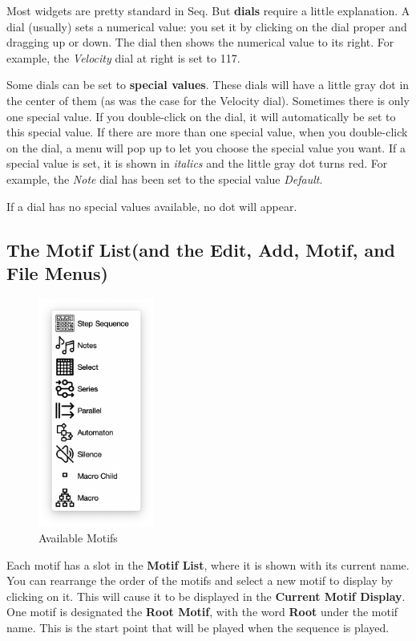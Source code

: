 \documentclass[twoside,10pt]{article}
\begin{document}
Most widgets are pretty standard in Seq.  But {\bf dials} require a little explanation.    A dial (usually) sets a numerical value: you set it by clicking on the dial proper and dragging up or down.  The dial then shows the numerical value to its right.   For example, the {\it Velocity} dial at right is set to 117.  

Some dials can be set to {\bf special values}.  These dials will have a little gray dot in the center of them (as was the case for the Velocity dial).  Sometimes there is only one special value.  If you double-click on the dial, it will automatically be set to this special value. If there are more than one special value, when you double-click on the dial, a menu will pop up to let you choose the special value you want.  If a special value is set, it is shown in {\it italics} and the little gray dot turns red.    For example, the {\it Note} dial  has been set to the special value {\it Default}.

If a dial has no special values available, no dot will appear.


\subsection{The Motif List\quad(and the Edit, Add, Motif, and File Menus)}

\begin{figure}
\vspace{-2em}
\includegraphics[width=1.5in]{motifs}
\vspace{-2em}
\caption{Available Motifs}
\label{motiflist}
\vspace{-1em}
\end{figure}

Each motif has a slot in the {\bf Motif List}, where it is shown with its current name.  You can rearrange the order of the motifs and select a new motif to display by clicking on it.  This will cause it to be displayed in the {\bf Current Motif Display}.  One motif is designated the {\bf Root Motif}, with the word {\bf Root} under the motif name.  This is the start point that will be played when the sequence is played.
\end{document}
